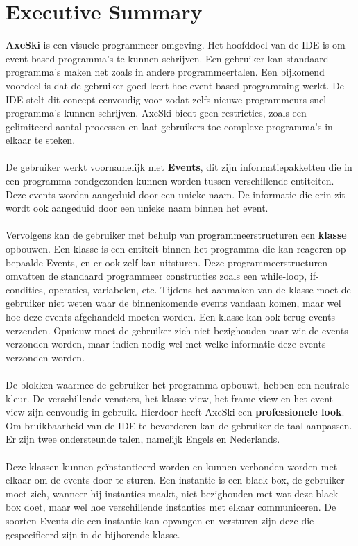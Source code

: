 \documentclass[]{article}
\begin{document}
\section{Executive Summary}
\label{summary}
\textbf{AxeSki} is een visuele programmeer omgeving. Het hoofddoel van de IDE is om event-based programma's te kunnen schrijven. Een gebruiker kan standaard programma's maken net zoals in andere programmeertalen. Een bijkomend voordeel is dat de gebruiker goed leert hoe event-based programming werkt. De IDE stelt dit concept eenvoudig voor zodat zelfs nieuwe programmeurs snel programma's kunnen schrijven. AxeSki biedt geen restricties, zoals een gelimiteerd aantal processen en laat gebruikers toe complexe programma's in elkaar te steken. \\\\
De gebruiker werkt voornamelijk met \textbf{Events}, dit zijn informatiepakketten die in een programma rondgezonden kunnen worden tussen verschillende entiteiten. Deze events worden aangeduid door een unieke naam. De informatie die erin zit wordt ook aangeduid door een unieke naam binnen het event. \\\\
Vervolgens kan de gebruiker met behulp van programmeerstructuren een \textbf{klasse} opbouwen. Een klasse is een entiteit binnen het programma die kan reageren op bepaalde Events, en er ook zelf kan uitsturen. Deze programmeerstructuren omvatten de standaard programmeer constructies zoals een while-loop, if-condities, operaties, variabelen, etc. Tijdens het aanmaken van de klasse moet de gebruiker niet weten waar de binnenkomende events vandaan komen, maar wel hoe deze events afgehandeld moeten worden. Een klasse kan ook terug events verzenden. Opnieuw moet de gebruiker zich niet bezighouden naar wie de events verzonden worden, maar indien nodig wel met welke informatie deze events verzonden worden. \\\\De blokken waarmee de gebruiker het programma opbouwt, hebben een neutrale kleur. De verschillende vensters, het klasse-view, het frame-view en het event-view zijn eenvoudig in gebruik. Hierdoor heeft AxeSki een \textbf{professionele look}. Om bruikbaarheid van de IDE te bevorderen kan de gebruiker de taal aanpassen. Er zijn twee ondersteunde talen, namelijk Engels en Nederlands.\\\\
Deze klassen kunnen ge\"instantieerd worden en kunnen verbonden worden met elkaar om de events door te sturen. Een instantie is een black box, de gebruiker moet zich, wanneer hij instanties maakt, niet bezighouden met wat deze black box doet, maar wel hoe verschillende instanties met elkaar communiceren. De soorten Events die een instantie kan opvangen en versturen zijn deze die gespecifieerd zijn in de bijhorende klasse.\\\\
\end{document}

